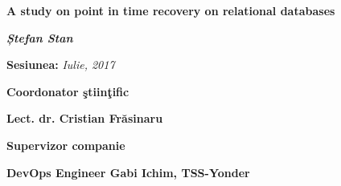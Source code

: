 \begin{titlepage}
\begin{center}
		\Huge
		\textbf{A study on point in time recovery on relational databases}	
		
		\vspace{1.2cm}			
		\vspace{0.2cm}
		\vspace{1.5cm}
		\huge
		\textit{\textbf{Ștefan Stan}}		
		
		\vspace{1.9cm}
		{\fontsize{18}{21,6}\selectfont 		
		\textbf{Sesiunea: }
		\textit{Iulie, 2017}\par}		
		
		\vspace{4.25cm}
		{\fontsize{14}{18}\selectfont 		
		\textbf{Coordonator ştiinţific}\par}			
		
		\vspace{0.5cm}
		{\fontsize{18}{21,6}\selectfont 		
		\textbf{Lect. dr. Cristian Frăsinaru}\par}			
		
		\vspace{0.5cm}
		{\fontsize{14}{18}\selectfont 		
		\textbf{Supervizor companie}\par}			
		
		\vspace{0.5cm}
		{\fontsize{18}{21,6}\selectfont 		
		\textbf{DevOps Engineer Gabi Ichim, TSS-Yonder}\par}			
		
		\normalsize
	\end{center}
\end{titlepage}